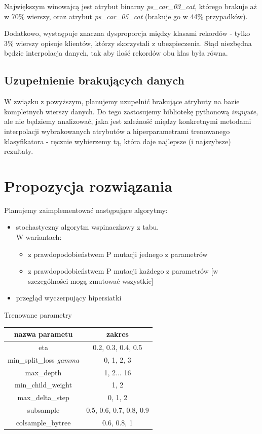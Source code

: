 \documentclass[11pt]{article}
\begin{document}
Największym winowajcą jest atrybut binarny \textsl{ps\_car\_03\_cat}, którego brakuje aż w 70\% wierszy, oraz atrybut \textsl{ps\_car\_05\_cat} (brakuje go w 44\% przypadków).

Dodatkowo, wystaępuje znaczna dysproporcja między klasami rekordów - tylko 3\% wierszy opisuje klientów, którzy skorzystali z ubezpieczenia. Stąd niezbędna będzie interpolacja danych, tak aby ilość rekordów obu klas była równa.

\subsection{Uzupełnienie brakujących danych}
W związku z powyższym, planujemy uzupełnić brakujące atrybuty na bazie kompletnych wierszy danych. Do tego zastosujemy bibliotekę pythonową \textsl{impyute}, ale nie będziemy analizować, jaka jest zależność między konkretnymi metodami interpolacji wybrakowanych atrybutów a hiperparametrami trenowanego klasyfikatora - ręcznie wybierzemy tą, która daje najlepsze (i najszybsze) rezultaty.

\section{Propozycja rozwiązania}
Planujemy zaimplementować następujące algorytmy:
\begin{itemize}
	\item stochastyczny algorytm wspinaczkowy z tabu. \\ W wariantach:
		\begin{itemize}
			\item z prawdopodobieństwem P mutacji jednego z parametrów
			\item z prawdopodobieństwem P mutacji każdego z parametrów [w szczególności mogą zmutować wszystkie]
		\end{itemize}
	\item przegląd wyczerpujący hipersiatki
\end{itemize}

Trenowane parametry
\begin{center}
	\begin{tabular}{|c|c|}
		\hline
		nazwa parametu & zakres \\
		\hline
		\hline
		eta &  0.2, 0.3, 0.4, 0.5\\ %
		\hline 
		min\_split\_loss \textit{gamma} & 0, 1, 2, 3\\ %
		\hline 
		max\_depth & 1, 2... 16\\
	    \hline
		min\_child\_weight & 1, 2\\ %
		\hline 
		max\_delta\_step & 0, 1, 2\\
		\hline 
		subsample & 0.5, 0.6, 0.7, 0.8, 0.9\\
		\hline
		colsample\_bytree &  0.6, 0.8, 1\\ %
		\hline 
	\end{tabular}
\end{center}                         
\end{document}
